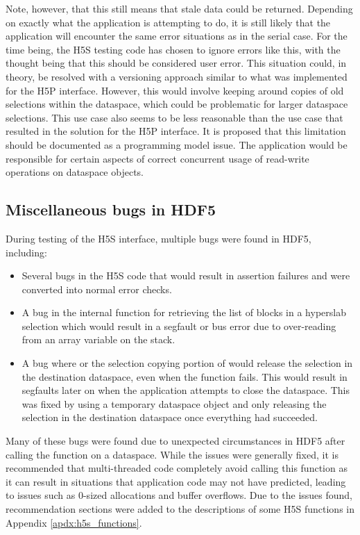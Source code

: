 \documentclass[../HDF5_RFC.tex]{subfiles}
\begin{document}
Note, however, that this still means that stale data could be returned. Depending on exactly what the
application is attempting to do, it is still likely that the application will encounter the same error
situations as in the serial case. For the time being, the H5S testing code has chosen to ignore errors
like this, with the thought being that this should be considered user error. This situation could, in
theory, be resolved with a versioning approach similar to what was implemented for the H5P interface.
However, this would involve keeping around copies of old selections within the dataspace, which could be
problematic for larger dataspace selections. This use case also seems to be less reasonable than the use
case that resulted in the solution for the H5P interface. It is proposed that this limitation should be
documented as a programming model issue. The application would be responsible for certain aspects of
correct concurrent usage of read-write operations on dataspace objects.

\subsection{Miscellaneous bugs in HDF5}

During testing of the H5S interface, multiple bugs were found in HDF5, including:

\begin{itemize}
    \item Several bugs in the H5S code that would result in assertion failures and were converted
          into normal error checks.
    \item A bug in the internal function for retrieving the list of blocks in a hyperslab selection
          which would result in a segfault or bus error due to over-reading from an array variable
          on the stack.
    \item A bug where  or the selection copying portion of
           would release the selection in the destination dataspace,
          even when the function fails. This would result in segfaults later on when the application
          attempts to close the dataspace. This was fixed by using a temporary dataspace object and
          only releasing the selection in the destination dataspace once everything had succeeded.
\end{itemize}

Many of these bugs were found due to unexpected circumstances in HDF5 after calling the function  on a dataspace. While the issues were generally fixed,
it is recommended that multi-threaded code completely avoid calling this function as it can result in
situations that application code may not have predicted, leading to issues such as 0-sized allocations
and buffer overflows. Due to the issues found, recommendation sections were added to the descriptions of
some H5S functions in Appendix \ref{apdx:h5s_functions}.
\end{document}
